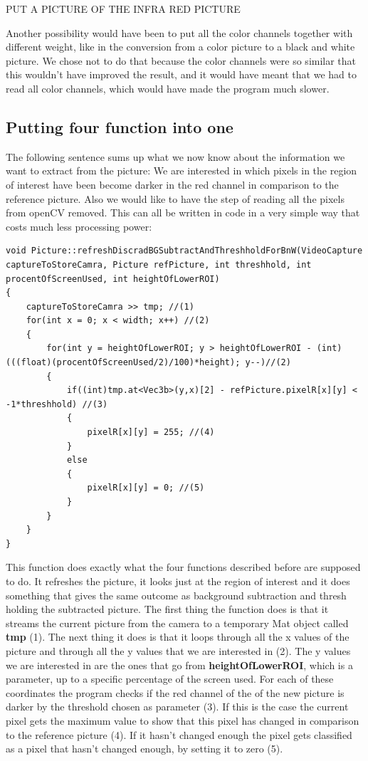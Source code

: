 PUT A PICTURE OF THE INFRA RED PICTURE

Another possibility would have been to put all the color channels together with different weight, like in the conversion from a color picture to a black and white picture. We chose not to do that because the color channels were so similar that this wouldn't have improved the result, and it would have meant that we had to read all color channels, which would have made the program much slower. 

\subsection{Putting four function into one}
The following sentence sums up what we now  know about the information we want to extract from the picture: We are interested in which pixels in the region of interest have been become darker in the red channel in comparison to the reference picture. Also we would like to have the step of reading all the pixels from openCV removed. This can all be written in code in a very simple way that costs much less processing power:

\begin{lstlisting}
void Picture::refreshDiscradBGSubtractAndThreshholdForBnW(VideoCapture captureToStoreCamra, Picture refPicture, int threshhold, int procentOfScreenUsed, int heightOfLowerROI)
{
	captureToStoreCamra >> tmp; //(1)
	for(int x = 0; x < width; x++) //(2)
	{
		for(int y = heightOfLowerROI; y > heightOfLowerROI - (int)(((float)(procentOfScreenUsed/2)/100)*height); y--)//(2)
		{
			if((int)tmp.at<Vec3b>(y,x)[2] - refPicture.pixelR[x][y] < -1*threshhold) //(3)
			{
				pixelR[x][y] = 255; //(4)
			}
			else
			{
				pixelR[x][y] = 0; //(5)
			}
		}
	}
}
\end{lstlisting}
This function does exactly what the four functions described before are supposed to do. It refreshes the picture, it looks just at the region of interest and it does something that gives the same outcome as background subtraction and thresh holding the subtracted picture.
The first thing the function does is that it streams the current picture from the camera to a temporary Mat object called \textbf{tmp} (1). The next thing it does is that it loops through all the x values of the picture and through all the y values that we are interested in (2). The y values we are interested in are the ones that go from \textbf{heightOfLowerROI}, which is a parameter, up to a specific percentage of the screen used. For each of these coordinates the program checks if the red channel of the of the new picture is darker by the threshold chosen as parameter (3). If this is the case the current pixel gets the maximum value to show that this pixel has changed in comparison to the reference picture (4). If it hasn't changed enough the pixel gets classified as a pixel that hasn't changed enough, by setting it to zero (5).

